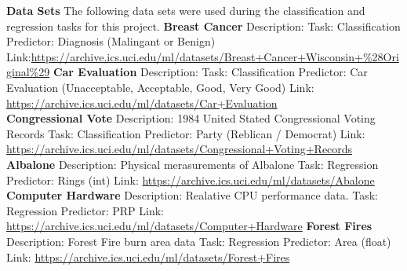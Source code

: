 \documentclass[twoside,11pt]{article}
\begin{document}
\newpage
{\noindent}{\bf Data Sets}\newline
The following data sets were used during the classification and regression tasks for this project.\newline
{\bf Breast Cancer}\newline
Description: \newline
Task: Classification\newline
Predictor: Diagnosis (Malingant or Benign)\newline
Link:\newline \url{https://archive.ics.uci.edu/ml/datasets/Breast+Cancer+Wisconsin+%28Original%29}\newline
{\noindent}\textbf{Car Evaluation}\newline
Description:\newline
Task: Classification\newline
Predictor: Car Evaluation (Unacceptable, Acceptable, Good, Very Good)\newline
Link: \newline
\url{https://archive.ics.uci.edu/ml/datasets/Car+Evaluation}\\
{\noindent}\textbf{Congressional Vote}\newline
Description: 1984 United Stated Congressional Voting Records\newline
Task: Classification \newline
Predictor: Party (Reblican / Democrat) \newline
Link: \newline
\url{https://archive.ics.uci.edu/ml/datasets/Congressional+Voting+Records}\newline
{\noindent}\textbf{Albalone}\newline
Description: Physical merasurements of Albalone\newline
Task: Regression\newline
Predictor: Rings (int)\newline
Link: \newline
\url{https://archive.ics.uci.edu/ml/datasets/Abalone}\newline
{\noindent}\textbf{Computer Hardware}\newline
Description: Realative CPU performance data.\newline
Task: Regression\newline
Predictor: PRP\newline
Link: \newline
\url{https://archive.ics.uci.edu/ml/datasets/Computer+Hardware}\newline
{\noindent}\textbf{Forest Fires}\newline
Description: Forest Fire burn area data\newline
Task: Regression\newline
Predictor: Area (float)\newline
Link: \newline
\url{https://archive.ics.uci.edu/ml/datasets/Forest+Fires}\newline
	
\end{document}
